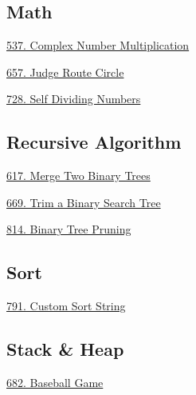 \subsection*{Math}
\begin{flushleft}
    \hyperref[algo:537]{537. Complex Number Multiplication}

    \hyperref[algo:657]{657. Judge Route Circle}

    \hyperref[algo:728]{728. Self Dividing Numbers}
\end{flushleft}

\subsection*{Recursive Algorithm}
\begin{flushleft}
    \hyperref[algo:617]{617. Merge Two Binary Trees}
    
    \hyperref[algo:669]{669. Trim a Binary Search Tree}

    \hyperref[algo:814]{814. Binary Tree Pruning}
\end{flushleft}

\subsection*{Sort}
\begin{flushleft}
    \hyperref[algo:791]{791. Custom Sort String}
\end{flushleft}

\subsection*{Stack \& Heap}
\begin{flushleft}
    \hyperref[algo:682]{682. Baseball Game}
\end{flushleft}

